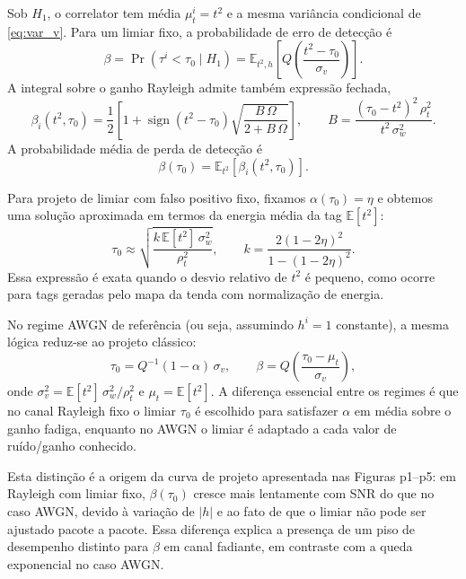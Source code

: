 \documentclass[12pt,a4paper]{article}
\begin{document}
Sob $H_1$, o correlator tem média $\mu_t^i = t^2$ e a mesma variância condicional de \eqref{eq:var_v}. Para um limiar fixo, a probabilidade de erro de detecção é
\begin{equation}\label{eq:beta_def}
    \beta = \Pr(\tau^i < \tau_0 \mid H_1) = \mathbb{E}_{t^2,h}\left[Q\left(\frac{t^2 - \tau_0}{\sigma_v}\right)\right].
\end{equation}
A integral sobre o ganho Rayleigh admite também expressão fechada,
\begin{equation}\label{eq:beta_rayleigh_closed}
    \beta_i(t^2,\tau_0) = \frac{1}{2} \left[1 + \operatorname{sign}(t^2 - \tau_0)
    \sqrt{\frac{B\,\Omega}{2 + B\,\Omega}}\right],
    \qquad B = \frac{(\tau_0 - t^2)^2\,\rho_t^2}{t^2\,\sigma_w^2}.
\end{equation}
A probabilidade média de perda de detecção é
\begin{equation}\label{eq:beta_avg}
    \beta(\tau_0) = \mathbb{E}_{t^2}\left[\beta_i(t^2,\tau_0)\right].
\end{equation}

Para projeto de limiar com falso positivo fixo, fixamos $\alpha(\tau_0)=\eta$ e obtemos uma solução aproximada em termos da energia média da tag $\mathbb{E}[t^2]$:
\begin{equation}\label{eq:tau0_solution}
    \tau_0 \approx \sqrt{\frac{k\,\mathbb{E}[t^2] \, \sigma_w^2}{\rho_t^2}},
    \qquad k = \frac{2(1-2\eta)^2}{1 - (1-2\eta)^2}.
\end{equation}
Essa expressão é exata quando o desvio relativo de $t^2$ é pequeno, como ocorre para tags geradas pelo mapa da tenda com normalização de energia.

No regime AWGN de referência (ou seja, assumindo $h^i=1$ constante), a mesma lógica reduz-se ao projeto clássico:
\begin{equation}\label{eq:tau0_awgn}
    \tau_0 = Q^{-1}(1-\alpha)\,\sigma_v,
    \qquad \beta = Q\left(\frac{\tau_0 - \mu_t}{\sigma_v}\right),
\end{equation}
onde $\sigma_v^2 = \mathbb{E}[t^2]\,\sigma_w^2/\rho_t^2$ e $\mu_t = \mathbb{E}[t^2]$. A diferença essencial entre os regimes é que no canal Rayleigh fixo o limiar $\tau_0$ é escolhido para satisfazer $\alpha$ em média sobre o ganho fadiga, enquanto no AWGN o limiar é adaptado a cada valor de ruído/ganho conhecido.

Esta distinção é a origem da curva de projeto apresentada nas Figuras p1--p5: em Rayleigh com limiar fixo, $\beta(\tau_0)$ cresce mais lentamente com SNR do que no caso AWGN, devido à variação de $|h|$ e ao fato de que o limiar não pode ser ajustado pacote a pacote. Essa diferença explica a presença de um piso de desempenho distinto para $\beta$ em canal fadiante, em contraste com a queda exponencial no caso AWGN.
\end{document}
